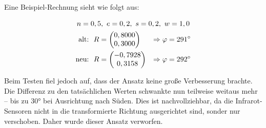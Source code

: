 Eine Beispiel\hyphen Rechnung sieht wie folgt aus:

\vspace{-0.75cm}
\begin{gather*}
    n=0,5, ~e=0,2, ~s=0,2, ~w=1,0  \\
    \begin{aligned}
        \text{alt:}~~ &R = \begin{pmatrix} 0,8000 \\ 0,3000 \end{pmatrix} &\Rightarrow \varphi=291^\circ \\
        \text{neu:}~~ &R = \begin{pmatrix} -0,7928 \\ 0,3158 \end{pmatrix} &\Rightarrow \varphi=292^\circ
    \end{aligned}
\end{gather*}
\vspace{-0.5cm}

Beim Testen fiel jedoch auf, dass der Ansatz keine große Verbesserung brachte. Die Differenz zu den tatsächlichen Werten schwankte nun teilweise weitaus mehr -- bis zu 30° bei Ausrichtung nach Süden. Dies ist nachvollziehbar, da die Infrarot\hyphen Sensoren nicht in die transformierte Richtung ausgerichtet sind, sonder nur verschoben. Daher wurde dieser Ansatz verworfen.
